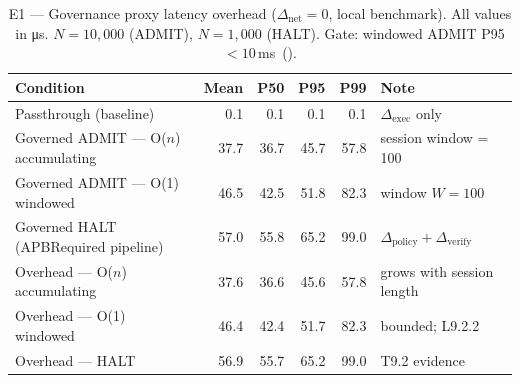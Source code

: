 \begin{table}[h]
\centering
\caption{E1 --- Governance proxy latency overhead ($\Delta_{\mathrm{net}}=0$, local benchmark). All values in \si{\micro\second}. $N=10,000$ (ADMIT), $N=1,000$ (HALT). Gate: windowed ADMIT P95 $<10\,$ms~(\checkmark).}
\label{tab:e1-overhead}
\begin{tabular}{lrrrrl}
\toprule
Condition & Mean & P50 & P95 & P99 & Note \\
\midrule
  Passthrough (baseline) & 0.1 & 0.1 & 0.1 & 0.1 & $\Delta_{\mathrm{exec}}$ only \\
  Governed ADMIT --- O($n$) accumulating & 37.7 & 36.7 & 45.7 & 57.8 & session window = 100 \\
  Governed ADMIT --- O(1) windowed & 46.5 & 42.5 & 51.8 & 82.3 & window $W=100$ \\
  Governed HALT (APBRequired pipeline) & 57.0 & 55.8 & 65.2 & 99.0 & $\Delta_{\mathrm{policy}}+\Delta_{\mathrm{verify}}$ \\
  Overhead --- O($n$) accumulating & 37.6 & 36.6 & 45.6 & 57.8 & grows with session length \\
  Overhead --- O(1) windowed & 46.4 & 42.4 & 51.7 & 82.3 & bounded; L9.2.2 \\
  Overhead --- HALT & 56.9 & 55.7 & 65.2 & 99.0 & T9.2 evidence \\
\bottomrule
\end{tabular}
\end{table}
